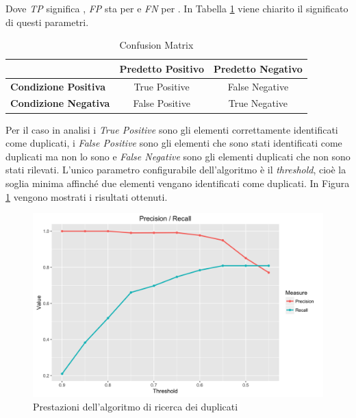 Dove \emph{TP} significa , \emph{FP} sta per  e \emph{FN} per . In Tabella \ref{table:confusion-matrix} viene chiarito il significato di questi parametri.

\begin{table}[ht]
	\caption{Confusion Matrix}
	\label{table:confusion-matrix}
	\begin{tabularx}{\textwidth}{l | cc}
		\toprule
		& \textbf{Predetto Positivo} & \textbf{Predetto Negativo} \\
		\midrule
		\textbf{Condizione Positiva} & True Positive & False Negative  \\
		\hline
		\textbf{Condizione Negativa} & False Positive & True Negative \\
		\bottomrule
	\end{tabularx}
\end{table}

Per il caso in analisi i \emph{True Positive} sono gli elementi correttamente identificati come duplicati, i \emph{False Positive} sono gli elementi che sono stati identificati come duplicati ma non lo sono e \emph{False Negative} sono gli elementi duplicati che non sono stati rilevati. L'unico parametro configurabile dell'algoritmo è il \emph{threshold}, cioè la soglia minima affinché due elementi vengano identificati come duplicati. In Figura \ref{fig:prestazioni-algoritmo-duplicati} vengono mostrati i risultati ottenuti.

\begin{figure}[ht]
	\centering
	\includegraphics[width=\textwidth]{3-metodologia-camus/Immagini/similarity_precision_recall.png}
	\caption{Prestazioni dell'algoritmo di ricerca dei duplicati}\label{fig:prestazioni-algoritmo-duplicati}
\end{figure}


